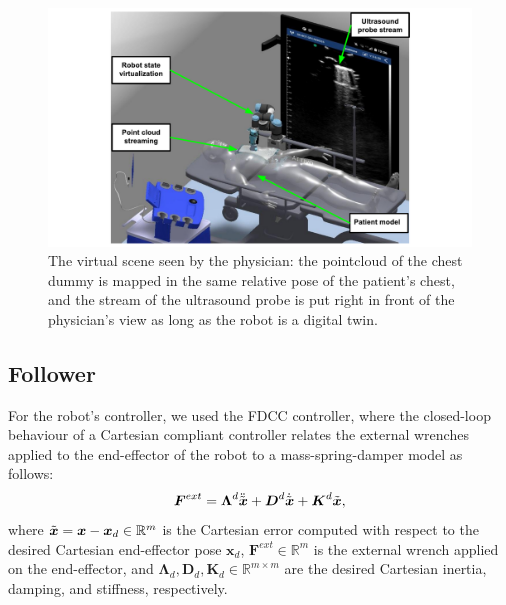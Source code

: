\begin{figure}[t]
    \centering
    \includegraphics[width=0.9\columnwidth,trim={3.2cm 0 3.2cm 0},clip]{images/framework/env2.pdf}
    \caption{The virtual scene seen by the physician: the pointcloud of the chest dummy is mapped in the same relative pose of the patient's chest, and the stream of the ultrasound probe is put right in front of the physician's view as long as the robot is a digital twin.}
    \label{fig:vrenv}
\end{figure}


\subsection{Follower}
For the robot's controller, we used the FDCC controller\cite{scherzinger2017forward}, where the closed-loop behaviour of a Cartesian compliant controller relates the external wrenches applied to the end-effector of the robot to a mass-spring-damper model as follows:
\begin{equation}
\boldsymbol{F}^{ext} = \boldsymbol{\Lambda}^d\ddot{\Tilde{\boldsymbol{x}}} + \boldsymbol{D}^d\dot{\Tilde{\boldsymbol{x}}} + \boldsymbol{K}^d\Tilde{\boldsymbol{x}},
    \label{eq:cartesian_impedance_inertia_shaping}
\end{equation}
where $\Tilde{\boldsymbol{x}} = \boldsymbol{x} - \boldsymbol{x}_d \in\mathbb{R}^{m}$ is the Cartesian error computed with respect to the desired Cartesian end-effector pose $\boldsymbol{x}_d$, $\boldsymbol{F}^{ext}\in\mathbb{R}^{m}$ is the external wrench applied on the end-effector, and $\boldsymbol{\Lambda}_d, \boldsymbol{D}_d ,\boldsymbol{K}_d\in\mathbb{R}^{m\times m}$ are the desired Cartesian inertia, damping, and stiffness, respectively. %

